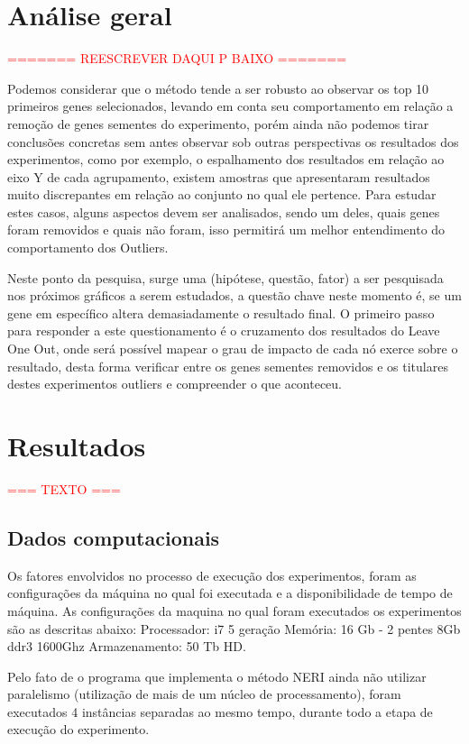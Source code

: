 %
\newpage
%
\section{Análise geral}
%
\textcolor{red}{======= REESCREVER DAQUI P BAIXO =======}

Podemos considerar que o método tende a ser robusto ao observar os top 10 primeiros genes selecionados, levando em conta seu comportamento em relação a remoção de genes sementes do experimento, porém ainda não podemos tirar conclusões concretas sem antes observar sob outras perspectivas os resultados dos experimentos, como por exemplo, o espalhamento dos resultados em relação ao eixo Y de cada agrupamento, existem amostras que apresentaram resultados muito discrepantes em relação ao conjunto no qual ele pertence.
Para estudar estes casos, alguns aspectos devem ser analisados, sendo um deles, quais genes foram removidos e quais não foram, isso permitirá um melhor entendimento do comportamento dos Outliers.

Neste ponto da pesquisa, surge uma (hipótese, questão, fator) a ser pesquisada nos próximos gráficos a serem estudados, a questão chave neste momento é, se um gene em específico altera demasiadamente o resultado final.
O primeiro passo para responder a este questionamento é o cruzamento dos resultados do Leave One Out, onde será possível mapear o grau de impacto de cada nó exerce sobre o resultado, desta forma verificar entre os genes sementes removidos e 
os titulares destes experimentos outliers e compreender o que aconteceu.


\section{Resultados}
\textcolor{red}{=== TEXTO ===}

\subsection{Dados computacionais}
Os fatores envolvidos no processo de execução dos experimentos, foram as configurações da máquina no qual foi executada e a disponibilidade de tempo de máquina.
As configurações da maquina no qual foram executados os experimentos são as descritas abaixo:
Processador: i7 5 geração
Memória: 16 Gb - 2 pentes 8Gb ddr3 1600Ghz
Armazenamento: 50 Tb HD.
 
Pelo fato de o programa que implementa o método NERI ainda não utilizar paralelismo (utilização de mais de um núcleo de processamento), foram executados 4 instâncias separadas ao mesmo tempo, durante todo a etapa de execução do experimento.

